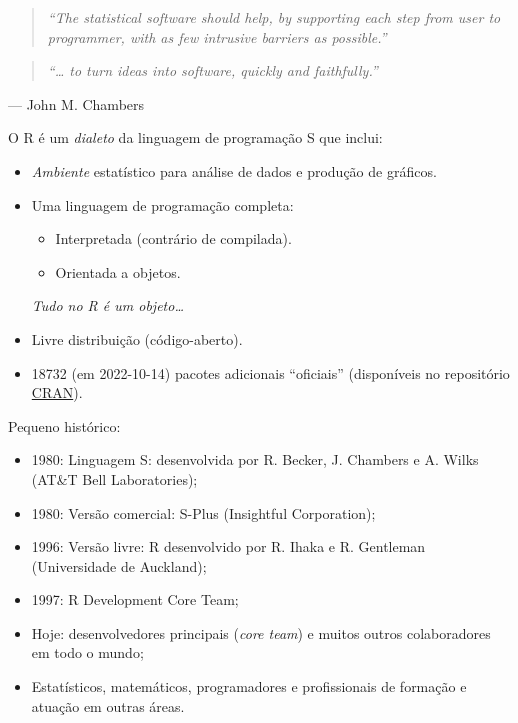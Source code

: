 \documentclass[
  10pt,
  a4paper]{book}
\providecommand{\tightlist}{%
  \setlength{\itemsep}{0pt}\setlength{\parskip}{0pt}}
\begin{document}
\begin{quote}
\emph{``The statistical software should help, by supporting each step from
user to programmer, with as few intrusive barriers as possible.''}
\end{quote}

\begin{quote}
\emph{``\ldots{} to turn ideas into software, quickly and faithfully.''}
\end{quote}

--- John M. Chambers

O R é um \emph{dialeto} da linguagem de programação S que inclui:

\begin{itemize}
\item
  \emph{Ambiente} estatístico para análise de dados e produção de gráficos.
\item
  Uma linguagem de programação completa:

  \begin{itemize}
  \tightlist
  \item
    Interpretada (contrário de compilada).
  \item
    Orientada a objetos.
  \end{itemize}

  \emph{Tudo no R é um objeto\ldots{}}
\item
  Livre distribuição (código-aberto).
\item
  18732 (em 2022-10-14) pacotes adicionais ``oficiais''
  (disponíveis no repositório \href{https://cran-r.c3sl.ufpr.br/web/packages/index.html}{CRAN}).
\end{itemize}

Pequeno histórico:

\begin{itemize}
\tightlist
\item
  1980: Linguagem S: desenvolvida por R. Becker, J. Chambers e A. Wilks
  (AT\&T Bell Laboratories);
\item
  1980: Versão comercial: S-Plus (Insightful Corporation);
\item
  1996: Versão livre: R desenvolvido por R. Ihaka e R. Gentleman
  (Universidade de Auckland);
\item
  1997: R Development Core Team;
\item
  Hoje: desenvolvedores principais (\emph{core team}) e muitos outros colaboradores em
  todo o mundo;
\item
  Estatísticos, matemáticos, programadores e profissionais de formação e atuação em outras áreas.
\end{itemize}
\end{document}
